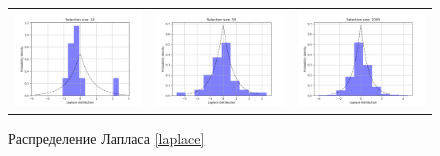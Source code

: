 \documentclass[a4paper]{article}
\begin{document}
	\begin{figure}[H]
		\centering
		\begin{tabular}{ccc}
			\includegraphics[width=55mm, height =0.25\textheight]{laplace_10.png}
			&
			\includegraphics[width=55mm, height =0.25\textheight]{laplace_50.png}
			&
			\includegraphics[width=55mm, height =0.25\textheight]{laplace_1000.png}
		\end{tabular}
		\caption{Распределение Лапласа \eqref{laplace}}
		\label{fig:laplace}
	\end{figure}
\end{document}
